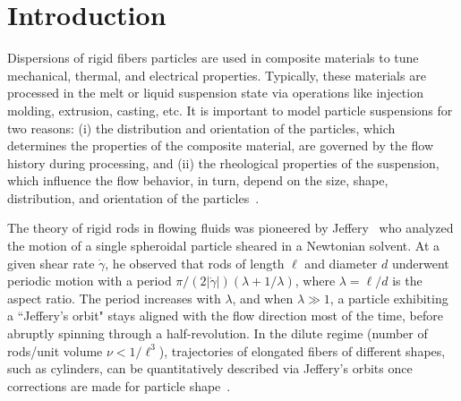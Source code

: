 \documentclass[AMA,STIX1COL]{WileyNJD-v2}
\begin{document}

\section{Introduction}\label{s:intro}
Dispersions of rigid fibers particles are used in composite materials to
tune mechanical, thermal, and electrical properties. Typically, these
materials are processed in the melt or liquid suspension state via
operations like injection molding, extrusion, casting, etc. It is
important to model particle suspensions for two reasons: (i) the
distribution and orientation of the particles, which determines the
properties of the composite material, are governed by the flow history
during processing, and (ii) the rheological properties of the
suspension, which influence the flow behavior, in turn, depend on the
size, shape, distribution, and orientation of the
particles~\cite{larsoncf}.

The theory of rigid rods in flowing fluids was pioneered by
Jeffery~\cite{Jeffery1922} who analyzed the motion of a single
spheroidal particle sheared in a Newtonian solvent. At a given shear
rate $\dot{\gamma}$, he observed that rods of length $\ell$ and diameter
$d$ underwent periodic motion with a period $\pi/(2|\dot{\gamma}|)
(\lambda + 1/\lambda)$, where $\lambda = \ell/d$ is the aspect ratio.
The period increases with $\lambda$, and when $\lambda \gg 1$, a
particle exhibiting a ``Jeffery's orbit" stays aligned with the flow
direction most of the time, before abruptly spinning through a
half-revolution. In the dilute regime (number of rods/unit volume $\nu <
1/\ell^3$), trajectories of elongated fibers of different shapes, such
as cylinders, can be quantitatively described via Jeffery's orbits once
corrections are made for particle shape~\cite{Bretherton1962}.
\end{document}
